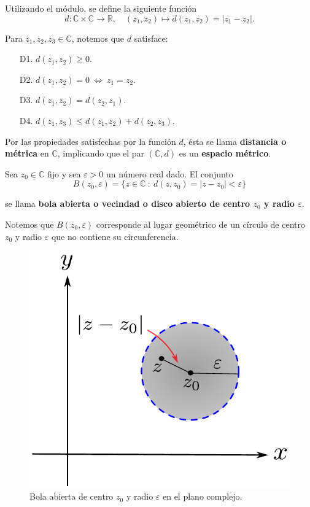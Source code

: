 Utilizando el módulo, se define la siguiente función
$$d: \mathbb{C} \times \mathbb{C} \longrightarrow \mathbb{R}, \quad (z_1,z_2) \mapsto d(z_1,z_2) = |z_1 - z_2|.$$

Para $z_1, z_2, z_3 \in \mathbb{C}$, notemos que $d$ satisface:

\begin{itemize}
\item[D1.] $d(z_1,z_2) \geq 0$.

\item[D2.] $d(z_1,z_2) = 0 ~\Leftrightarrow~ z_1 = z_2$.

\item[D3.] $d(z_1,z_2) = d(z_2, z_1)$.

\item[D4.] $d(z_1,z_3) \leq d(z_1,z_2) + d(z_2,z_3)$.
\end{itemize}

Por las propiedades satisfechas por la función $d$, ésta se llama \textbf{distancia o métrica} en $\mathbb{C}$, implicando que el par $(\mathbb{C},d)$ es un \textbf{espacio métrico}.

\begin{defi}
Sea $z_0 \in \mathbb{C}$ fijo y sea $\varepsilon >0$ un número real dado. El conjunto
$$B(z_0, \varepsilon) = \{z \in \mathbb{C} ~:~ d(z,z_0) = |z-z_0| < \varepsilon\}$$

se llama \textbf{bola abierta o vecindad o disco abierto de centro $z_0$ y radio $\varepsilon$}.
\end{defi}

Notemos que $B(z_0, \varepsilon)$ corresponde al lugar geométrico de un círculo de centro $z_0$ y radio $\varepsilon$ que no contiene su circunferencia.

\begin{figure}[H]
    \centering
    \includegraphics[scale=0.55]{Figuras/BolaAbierta.pdf}
    \caption{Bola abierta de centro $z_0$ y radio $\varepsilon$ en el plano complejo.}
    \label{BolaAbierta}
\end{figure}

